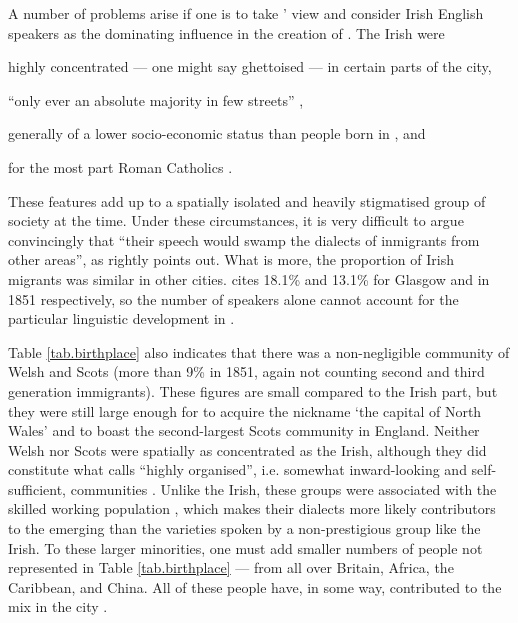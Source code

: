 A number of problems arise if one is to take \citeauthor{knowles1973}' view and consider Irish English speakers as the dominating influence in the creation of .
The Irish were
\begin{inparaenum}[a\upshape)]
	\item highly concentrated --- one might say ghettoised --- in certain parts of the city, 
	\item ``only ever an absolute majority in few streets'' \citep[120]{honeybone2007}, 
	\item generally of a lower socio-economic status than people born in , and
	\item for the most part Roman Catholics \citep[cf.][330]{belchemmacraild2006}.
\end{inparaenum}
These features add up to a spatially isolated and heavily stigmatised group of  society at the time.
Under these circumstances, it is very difficult to argue convincingly that ``their speech would swamp the dialects of inmigrants from other areas'', as \citet[120]{honeybone2007} rightly points out.
What is more, the proportion of Irish migrants was similar in other cities.
\citet[140]{honeybone2007} cites 18.1\% and 13.1\% for Glasgow and  in 1851 respectively, so the number of speakers alone cannot account for the particular linguistic development in .

Table \ref{tab.birthplace} also indicates that there was a non-negligible community of Welsh and Scots (more than 9\% in 1851, again not counting second and third generation immigrants).
These figures are small compared to the Irish part, but they were still large enough for  to acquire the nickname `the capital of North Wales' and to boast the second-largest Scots community in England.
Neither Welsh nor Scots were spatially as concentrated as the Irish, although they did constitute what \citeauthor{honeybone2007} calls ``highly organised'', i.e. somewhat inward-looking and self-sufficient, communities \citep[cf.][120--121]{honeybone2007}.
Unlike the Irish, these groups were associated with the skilled working population \citep[cf.][202--203]{belchem2006b}, which makes their dialects more likely contributors to the emerging  than the varieties spoken by a non-prestigious group like the Irish.
To these larger minorities, one must add smaller numbers of people not represented in Table \ref{tab.birthplace} --- from all over Britain, Africa, the Caribbean, and China.
All of these people have, in some way, contributed to the  mix in the city \citep[cf.][116]{honeybone2007}.

